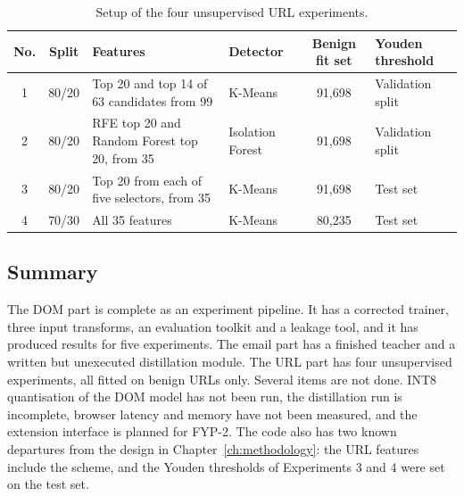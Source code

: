 \documentclass{FastFyp}
\begin{document}
\begin{table}[H]
	\centering
	\caption{Setup of the four unsupervised URL experiments.}
	\label{tab:url-experiments}
	\small
	\begin{tabularx}{\textwidth}{|c|c|>{\raggedright\arraybackslash}X|>{\raggedright\arraybackslash}p{2.6cm}|c|>{\raggedright\arraybackslash}p{2.9cm}|}
		\hline
		\textbf{No.} & \textbf{Split} & \textbf{Features} & \textbf{Detector} & \textbf{Benign fit set} & \textbf{Youden threshold} \\
		\hline
		1 & 80/20 & Top 20 and top 14 of 63 candidates from 99 & K-Means & 91,698 & Validation split \\
		\hline
		2 & 80/20 & RFE top 20 and Random Forest top 20, from 35 & Isolation Forest & 91,698 & Validation split \\
		\hline
		3 & 80/20 & Top 20 from each of five selectors, from 35 & K-Means & 91,698 & Test set \\
		\hline
		4 & 70/30 & All 35 features & K-Means & 80,235 & Test set \\
		\hline
	\end{tabularx}
\end{table}

\subsection{Summary}
\label{sec:impl-summary}
The DOM part is complete as an experiment pipeline. It has a corrected trainer, three input transforms, an evaluation toolkit and a leakage tool, and it has produced results for five experiments. The email part has a finished teacher and a written but unexecuted distillation module. The URL part has four unsupervised experiments, all fitted on benign URLs only. Several items are not done. INT8 quantisation of the DOM model has not been run, the distillation run is incomplete, browser latency and memory have not been measured, and the extension interface is planned for FYP-2. The code also has two known departures from the design in Chapter~\ref{ch:methodology}: the URL features include the scheme, and the Youden thresholds of Experiments 3 and 4 were set on the test set. 
\end{document}

